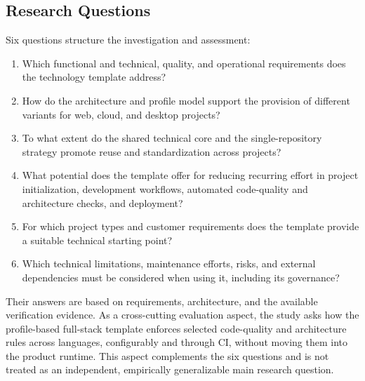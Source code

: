 \subsection{Research Questions}
\label{subsec:fragestellungen}

Six questions structure the investigation and assessment:

\begin{enumerate}
  \item Which functional and technical, quality, and operational requirements
    does the technology template address?
  \item How do the architecture and profile model support the provision of
    different variants for web, cloud, and desktop projects?
  \item To what extent do the shared technical core and the single-repository
    strategy promote reuse and standardization across projects?
  \item What potential does the template offer for reducing recurring effort in
    project initialization, development workflows, automated code-quality and
    architecture checks, and deployment?
  \item For which project types and customer requirements does the template
    provide a suitable technical starting point?
  \item Which technical limitations, maintenance efforts, risks, and external
    dependencies must be considered when using it, including its governance?
\end{enumerate}

Their answers are based on requirements, architecture, and the available
verification evidence. As a cross-cutting evaluation aspect, the study asks
how the profile-based full-stack template enforces selected code-quality and
architecture rules across languages, configurably and through CI, without
moving them into the product runtime. This aspect complements the six
questions and is not treated as an independent, empirically generalizable main
research question.

